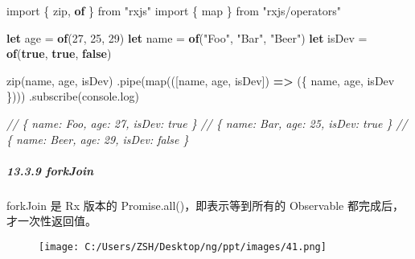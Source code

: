 \documentclass[
]{article}
\newenvironment{Shaded}{}{}
\newcommand{\BuiltInTok}[1]{#1}
\newcommand{\CommentTok}[1]{\textcolor[rgb]{0.38,0.63,0.69}{\textit{#1}}}
\newcommand{\DecValTok}[1]{\textcolor[rgb]{0.25,0.63,0.44}{#1}}
\newcommand{\FunctionTok}[1]{\textcolor[rgb]{0.02,0.16,0.49}{#1}}
\newcommand{\ImportTok}[1]{#1}
\newcommand{\KeywordTok}[1]{\textcolor[rgb]{0.00,0.44,0.13}{\textbf{#1}}}
\newcommand{\NormalTok}[1]{#1}
\newcommand{\OperatorTok}[1]{\textcolor[rgb]{0.40,0.40,0.40}{#1}}
\newcommand{\StringTok}[1]{\textcolor[rgb]{0.25,0.44,0.63}{#1}}
\begin{document}
\begin{Shaded}
\begin{Highlighting}[]
\ImportTok{import}\NormalTok{ \{ zip}\OperatorTok{,} \KeywordTok{of}\NormalTok{ \} }\ImportTok{from} \StringTok{"rxjs"}
\ImportTok{import}\NormalTok{ \{ map \} }\ImportTok{from} \StringTok{"rxjs/operators"}

\KeywordTok{let}\NormalTok{ age }\OperatorTok{=} \KeywordTok{of}\NormalTok{(}\DecValTok{27}\OperatorTok{,} \DecValTok{25}\OperatorTok{,} \DecValTok{29}\NormalTok{)}
\KeywordTok{let}\NormalTok{ name }\OperatorTok{=} \KeywordTok{of}\NormalTok{(}\StringTok{"Foo"}\OperatorTok{,} \StringTok{"Bar"}\OperatorTok{,} \StringTok{"Beer"}\NormalTok{)}
\KeywordTok{let}\NormalTok{ isDev }\OperatorTok{=} \KeywordTok{of}\NormalTok{(}\KeywordTok{true}\OperatorTok{,} \KeywordTok{true}\OperatorTok{,} \KeywordTok{false}\NormalTok{)}

\FunctionTok{zip}\NormalTok{(name}\OperatorTok{,}\NormalTok{ age}\OperatorTok{,}\NormalTok{ isDev)}
  \OperatorTok{.}\FunctionTok{pipe}\NormalTok{(}\FunctionTok{map}\NormalTok{(([name}\OperatorTok{,}\NormalTok{ age}\OperatorTok{,}\NormalTok{ isDev]) }\KeywordTok{=\textgreater{}}\NormalTok{ (\{ name}\OperatorTok{,}\NormalTok{ age}\OperatorTok{,}\NormalTok{ isDev \})))}
  \OperatorTok{.}\FunctionTok{subscribe}\NormalTok{(}\BuiltInTok{console}\OperatorTok{.}\FunctionTok{log}\NormalTok{)}

\CommentTok{// \{ name: \textquotesingle{}Foo\textquotesingle{}, age: 27, isDev: true \}}
\CommentTok{// \{ name: \textquotesingle{}Bar\textquotesingle{}, age: 25, isDev: true \}}
\CommentTok{// \{ name: \textquotesingle{}Beer\textquotesingle{}, age: 29, isDev: false \}}
\end{Highlighting}
\end{Shaded}

\hypertarget{1339-forkjoin}{%
\subparagraph{13.3.9 forkJoin}\label{1339-forkjoin}}

forkJoin 是 Rx 版本的 Promise.all()，即表示等到所有的 Observable
都完成后，才一次性返回值。

\begin{figure}
\centering
\texttt{[image: C:/Users/ZSH/Desktop/ng/ppt/images/41.png]}
\caption{}
\end{figure}
\end{document}
